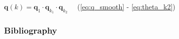 \documentclass[10pt, aspectratio=169]{beamer}
\theoremstyle{remark}
\theoremstyle{definition}
\begin{document}
\begin{frame}[allowframebreaks]
\begin{algorithm}[H]
{{            $\mathbf{q}(k) = \mathbf{q}_1 \cdot  \mathbf{q}_{k_1}\cdot \mathbf{q}_{k_2}\quad$ (\ref{eq:q_smooth} - \ref{eq:theta_k2})
       }
  	}
\end{algorithm}

\end{frame}












\begin{frame}[allowframebreaks]
\frametitle{Bibliography}
\printbibliography
\end{frame}
\end{document}
